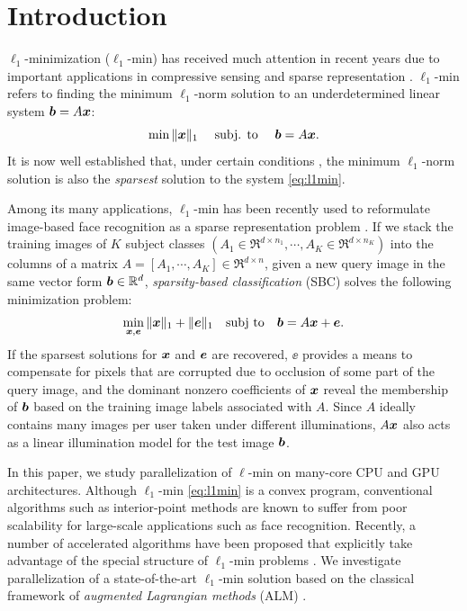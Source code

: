 \documentclass[10pt,twocolumn,letterpaper]{article}
\begin{document}
\section{Introduction} 
$\ell_1$-minimization ($\ell_1$-min) has received much attention in recent
years due to important applications in compressive sensing
\cite{BrucksteinA2007} and sparse representation \cite{WrightJ2010-PIEEE}.  
$\ell_1$-min refers to finding the minimum $\ell_1$-norm solution to an
underdetermined linear system ${\boldsymbol{b}}=A{\boldsymbol{x}}$:
\begin{equation}
\min \|{\boldsymbol{x}}\|_1\quad \mbox{ subj. to }\quad {\boldsymbol{b}} = A{\boldsymbol{x}}.
\label{eq:l1min}
\end{equation}
It is now well established that, under certain conditions
\cite{CandesE2005-IT_1,DonohoD2004}, the minimum $\ell_1$-norm solution is also
the \emph{sparsest} solution to the system \eqref{eq:l1min}.

Among its many applications, $\ell_1$-min has been recently used to reformulate
image-based face recognition as a sparse representation problem
\cite{WrightJ2009-PAMI}.  If we stack the training images of $K$ subject
classes $(A_1\in\Re^{d\times n_1}, \cdots, A_K\in\Re^{d\times n_K})$ into the
columns of a matrix $A = [A_1, \cdots, A_K]\in\Re^{d\times n}$, given a new
query image in the same vector form ${\boldsymbol{b}}\in{\mathbb{R}}^d$, \emph{sparsity-based
classification} (SBC) solves the following minimization problem:
\begin{equation}
\min_{{\boldsymbol{x}}, {\boldsymbol{e}}} \| {\boldsymbol{x}} \|_1 + \|{\boldsymbol{e}}\|_1 \quad \textup{subj to} \quad {\boldsymbol{b}} = A {\boldsymbol{x}} + {\boldsymbol{e}}.
\label{eq:l1min_denoise}
\end{equation}
If the sparsest solutions for ${\boldsymbol{x}}$ and $\boldsymbol{e}$ are recovered, $\ee$ provides a
means to compensate for pixels that are corrupted due to occlusion of some part of the query
image, and the dominant nonzero coefficients of ${\boldsymbol{x}}$ reveal the membership of
${\boldsymbol{b}}$ based on the training image labels associated with $A$.  Since $A$ ideally
contains many images per user taken under different illuminations, 
$A{\boldsymbol{x}}$ also acts as a linear illumination model for the test image ${\boldsymbol{b}}$.

In this paper, we study parallelization of $\ell$-min on many-core CPU and GPU
architectures. Although $\ell_1$-min \eqref{eq:l1min} is a convex
program, conventional algorithms such as interior-point methods
\cite{ChenS2001-SIAM,TibshiraniR1996} are known to suffer from poor scalability
for large-scale applications such as face recognition. Recently, a number of
accelerated algorithms have been proposed that explicitly take advantage of
the special structure of $\ell_1$-min problems
\cite{LorisI2009,YangA2010-ICIP}. We investigate parallelization of a
state-of-the-art $\ell_1$-min solution based on the classical framework of
\emph{augmented Lagrangian methods} (ALM) \cite{BertsekasD2003,YangA2010-ICIP}.
\end{document}
